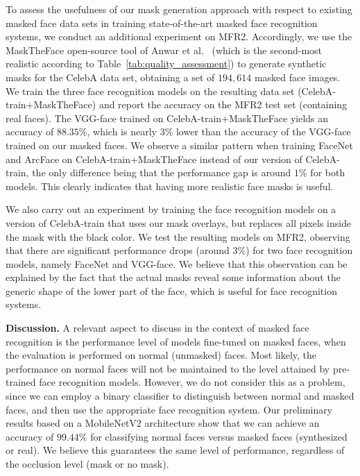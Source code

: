 \documentclass{article}
\begin{document}
To assess the usefulness of our mask generation approach with respect to existing masked face data sets in training state-of-the-art masked face recognition systems, we conduct an additional experiment on MFR2. Accordingly, we use the MaskTheFace open-source tool of Anwar et al.~\cite{anwar2020arxiv} (which is the second-most realistic according to Table~\ref{tab:quality_assessment}) to generate synthetic masks for the CelebA data set, obtaining a set of $194,614$ masked face images. We train the three face recognition models on the resulting data set (CelebA-train+MaskTheFace) and report the accuracy on the MFR2 test set (containing real faces). The VGG-face trained on CelebA-train+MaskTheFace yields an accuracy of $88.35\%$, which is nearly $3\%$ lower than the accuracy of the VGG-face trained on our masked faces. We observe a similar pattern when training FaceNet and ArcFace on CelebA-train+MaskTheFace instead of our version of CelebA-train, the only difference being that the performance gap is around $1\%$ for both models. This clearly indicates that having more realistic face masks is useful.

We also carry out an experiment by training the face recognition models on a version of CelebA-train that uses our mask overlays, but replaces all pixels inside the mask with the black color. We test the resulting models on MFR2, observing that there are significant performance drops (around $3\%$) for two face recognition models, namely FaceNet and VGG-face. We believe that this observation can be explained by the fact that the actual masks reveal some information about the generic shape of the lower part of the face, which is useful for face recognition systems.



{\bf Discussion.} 
A relevant aspect to discuss in the context of masked face recognition is the performance level of models fine-tuned on masked faces, when the evaluation is performed on normal (unmasked) faces. Most likely, the performance on normal faces will not be maintained to the level attained by pre-trained face recognition models. However, we do not consider this as a problem, since we can employ a binary classifier to distinguish between normal and masked faces, and then use the appropriate face recognition system. Our preliminary results based on a MobileNetV2 architecture \cite{SandlerCVPR18} show that we can achieve an accuracy of $99.44\%$ for classifying normal faces versus masked faces (synthesized or real). We believe this guarantees the same level of performance, regardless of the occlusion level (mask or no mask).
\end{document}
